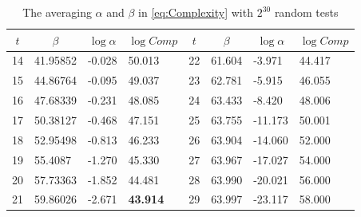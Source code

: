\begin{table}[htbp]
  \centering
  \caption{The averaging $\alpha$ and $\beta$ in \eqref{eq:Complexity} with $2^{30}$ random tests}\label{tab:AlphaAndBeta}
    \begin{tabular}{|l|l|l|l|l|l|l|l|}
    \hline
    \multicolumn{1}{|c|}{$t$} & \multicolumn{1}{c|}{$\beta$} & \multicolumn{1}{c|}{$\log\alpha$} & \multicolumn{1}{c|}{$\log Comp$} & \multicolumn{1}{c|}{$t$} & \multicolumn{1}{c|}{$\beta$} & \multicolumn{1}{c|}{$\log\alpha$} & \multicolumn{1}{c|}{$\log Comp$} \\
    \hline

    14    & 41.95852 & -0.028 & 50.013 & 22    & 61.604 & -3.971 & 44.417 \\
    \hline
    15    & 44.86764 & -0.095 & 49.037 & 23    & 62.781 & -5.915 & 46.055 \\
    \hline
    16    & 47.68339 & -0.231 & 48.085 & 24    & 63.433 & -8.420 & 48.006 \\
    \hline
    17    & 50.38127 & -0.468 & 47.151 & 25    & 63.755 & -11.173 & 50.001 \\
    \hline
    18    & 52.95498 & -0.813 & 46.233 & 26    & 63.904 & -14.060 & 52.000 \\
    \hline
    19    & 55.4087 & -1.270 & 45.330 & 27    & 63.967 & -17.027 & 54.000 \\
    \hline
    20    & 57.73363 & -1.852 & 44.481 & 28    & 63.990 & -20.021 & 56.000 \\
    \hline
    21    & 59.86026 & -2.671 & \textbf{43.914} & 29    & 63.997 & -23.117 & 58.000 \\
    \hline

    \end{tabular}%
\end{table}%


